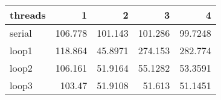 \begin{tabular}{lrrrr}
\hline
 threads   &       1 &        2 &        3 &        4 \\
\hline
 serial    & 106.778 & 101.143  & 101.286  &  99.7248 \\
 loop1     & 118.864 &  45.8971 & 274.153  & 282.774  \\
 loop2     & 106.161 &  51.9164 &  55.1282 &  53.3591 \\
 loop3     & 103.47  &  51.9108 &  51.613  &  51.1451 \\
\hline
\end{tabular}
